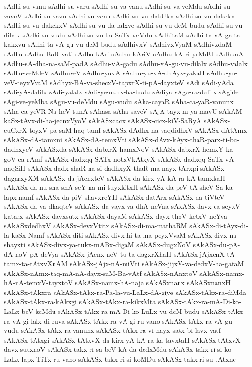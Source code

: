 {sAdhi-su-vanu
sAdhi-su-varu
sAdhi-su-va-vanu
sAdhi-su-va-veMdu
sAdhi-su-vavoV
sAdhi-su-vavu
sAdhi-su-venu
sAdhi-su-vu-dakUkx
sAdhi-su-vu-dakekx
sAdhi-su-vu-dakekxV
sAdhi-su-vu-da-lalxve
sAdhi-su-vu-deM-budu
sAdhi-su-vu-dilalx
sAdhi-su-vudu
sAdhi-su-vu-ka-SaTx-veMdu
sAdhitaM
sAdhi-ta-vA-ga-ta-kakxvu
sAdhi-ta-vA-gu-vu-deM-budu
sAdhivxV
sAdhivxVyaM
sAdhivxdaM
sAdhu
sAdhu-BaR-vati
sAdhu-kAri
sAdhu-kAriV
sAdhu-kA-ri-yeMdU
sAdhunA
sAdhu-sA-dha-na-saM-padA
sAdhu-vA-gadu
sAdhu-vA-gu-vu-dilalx
sAdhu-valalx
sAdhu-veMdeV
sAdhuveV
sAdhu-yuvA
sAdhu-yu-vA-dhAyx-yakaH
sAdhu-yu-veV-teyxVvaM
sAdhyx-BA-va-shecxV-tapxrX-ti-pA-dayxteV
sAdi
sAdi-yAda
sAdi-yA-dalilx
sAdi-yalalx
sAdi-ye-nanx-ba-hudu
sAdiyo
sAga-ra-dalilx
sAgide
sAgi-ve-yeMba
sAgu-vu-deMdu
sAgu-vudu
sAha-cayaR
sAha-ca-yaR-vanunx
sAha-ca-yeVR-Na-heV-tunA
sAhasa
sAha-saveV
sAjA-tayx-ni-ya-mavU
sAkAM-kaSx-tAvx-di-ha-jecnxVyoV
sAkASxcacx
sAkASx-cicx-kiV-SaRyA
sAkASx-cuCxrX-toyxV-pa-saM-haq-tamf
sAkASx-dAdhx-na-vaqdidhxV
sAkASx-dAtAmx
sAkASx-dA-tamxni
sAkASx-dA-temxVti
sAkASx-dAvx-kAyx-thaR-parx-ti-bu-dadhxyeV
sAkASxda
sAkASx-dabxrX-hamxNoV
sAkASx-dabxrX-hemxY-ka-goV-ca-rAmf
sAkASx-dadxqq-SATx-notxVkAtxyX
sAkASx-dadxqq-SaTx-vA-naqSiH
sAkASx-dadx-shaR-na-si-dadhxyX-thaR-ma-nayx-tArxpi
sAkASx-dagarxyXM
sAkASx-da-jAcnxteV
sAkASx-da-kirx-yA-kA-ra-kA-tamxkaH
sAkASx-da-nu-sha-shA-seY-na-mi-tuyxkitxH
sAkASx-da-peV-tA-sheV-Sa-ka-lapx-namf
sAkASx-da-piV-shavxreYH
sAkASx-datArx
sAkASx-da-tiVteV
sAkASx-da-va-dhaqteV
sAkASx-da-vayx-va-dhA-neVna
sAkASx-davx-ca-seyxV-katarx
sAkASx-davxsutx
sAkASx-dayaM
sAkASx-dayx-thoV-ketxV-neYva
sAkASxdedhxV
sAkASx-devxVtitx
sAkASx-di-ma-mathaRM
sAkASx-di-tAyx-di-la-kaSx-Namf
sAkASx-diti
sAkASx-divx-hi-ta-ma-peyxVvaM
sAkASx-divx-na-shayxti
sAkASx-divx-ya-tukx-mABx-digaM
sAkASx-dugxNoV
sAkASx-du-pA-dA-noV-pA-deVya
sAkASx-jAcnx-neV-tu-ta-dagxrXhaH
sAkASx-jAjxcnX-tA-tamx-ta-tAtxvXnAM
sAkASx-jAjx-nA-miVti
sAkASx-jijxV-va-dedxV-ha-gataM
sAkASx-nAmx-taq-mA-nA-dayx-saM-Ba-vAtf
sAkASx-nAnxtoV
sAkASx-namx-hA-nA-temxV-tayxtoV
sAkASx-namx-hA-naja
sAkASxnanx
sAkASxnanxH
sAkASx-tAkxra
sAkASx-tAkx-ra-Pa-la-vu-LaLx-dA-giye
sAkASx-tAkx-ra-diMda
sAkASx-tAkx-ra-kAkxgi
sAkASx-tAkx-ra-kikxMta
sAkASx-tAkx-ra-mA-Di-ko-LaLx-beV-keMdu
sAkASx-tAkx-ra-mA-Di-ko-LuLx-vu-deM-budu
sAkASx-tAkx-ra-vA-gi-lalx-di-ruva
sAkASx-tAkx-ra-vA-gi-ru-vano
sAkASx-tAkx-ra-vA-gu-vudu
sAkASx-tAkx-ra-vanunx
sAkASx-tAkx-ra-vi-nayx-satx-bi-lavx-vatf
sAkASx-tAtxgi
sAkASx-tAtxvX-da-kirx-yA-kA-ra-ka-tavxtaH
sAkASx-tAtxvX-davx-sutxnoV
sAkASx-takx-ri-sa-beV-kA-da-dedxMdu
sAkASx-takx-ri-si-ko-LaLx-lapx-TiTx-ru-vano
sAkASx-takx-ri-si-koMDu
sAkASx-takx-ri-su-tAtxne
}
